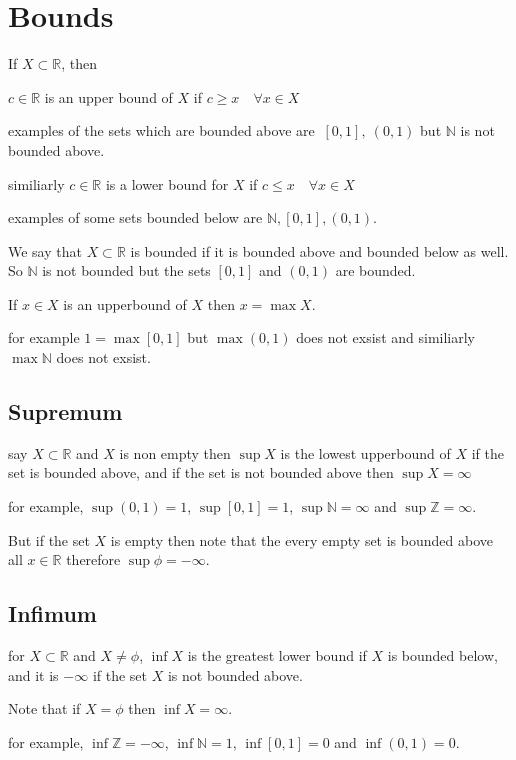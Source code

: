 \documentclass[12pt,a4paper]{article}
\begin{document}
 \section{Bounds} 
 If \(X \subset \mathbb{R}\), then 

 \(c \in \mathbb{R}\) is an upper bound of \(X\) if \(c \geq x \quad \forall x \in X  \)
  
 examples of the sets which are bounded above are \( \ [0,1], \ \left( 0,1 \right) \)  but \(\mathbb{N}\) is not bounded above.  
 
 similiarly \(c \in \mathbb{R}\) is a lower bound  for \(X\) if \(c \leq x \quad \forall x \in X\)
 
 examples of some sets bounded below are \(\mathbb{N}, [0,1], (0,1)\).  

 We say that \(X \subset \mathbb{R}\) is bounded if it is bounded above and bounded below as well. So \(\mathbb{N}\) is not bounded but the sets \([0,1] \) and \((0,1)\) are bounded.
 
 If \(x \in X \) is an upperbound of \(X\) then \(x=\max X\).
 
 for example \(1= \max [0,1]\) but \(\max (0,1)\) does not exsist and similiarly \(\max \mathbb{N}\) does not exsist.    
 
  \subsection{Supremum} 
say \(X \subset \mathbb{R}\) and \(X\) is non empty  then \(\sup X\) is the lowest upperbound of \(X\) if the set is bounded above, and if the set is not bounded above then \(\sup X = \infty \)

for example, \(\sup (0,1) = 1\), \(\sup [0,1] = 1\), \(\sup \mathbb{N} = \infty \) and \( \sup \mathbb{Z} = \infty \).

But if the set \(X \) is empty then note that the every empty set is bounded above all \(x \in \mathbb{R}\) therefore \( \sup \phi = - \infty \).    

 \subsection{Infimum} 
for \(X \subset \mathbb{R}\) and \(X \neq \phi\), \(\inf X\)  is the greatest lower bound if \(X\) is bounded below, and it is \(- \infty\) if the set \(X\) is not bounded above.

Note that if \(X=\phi \) then \(\inf X = \infty\).

for example, \(\inf \mathbb{Z} = -\infty \), \( \inf \mathbb{N} = 1 \), \( \inf [0,1] = 0\) and \(\inf (0,1) = 0\).
\end{document}
